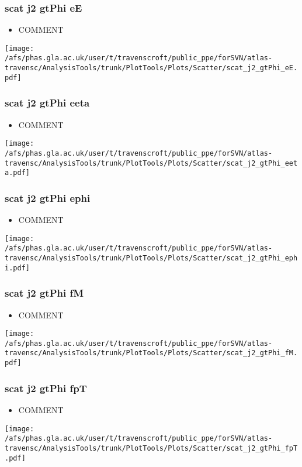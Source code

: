 \documentclass{beamer}
\begin{document}
\begin{frame}
\frametitle{scat j2 gtPhi eE}
\begin{itemize}
\item COMMENT
\end{itemize}
\begin{center}
\texttt{[image: /afs/phas.gla.ac.uk/user/t/travenscroft/public\_ppe/forSVN/atlas-travensc/AnalysisTools/trunk/PlotTools/Plots/Scatter/scat\_j2\_gtPhi\_eE.pdf]}
\end{center}
\end{frame}

\begin{frame}
\frametitle{scat j2 gtPhi eeta}
\begin{itemize}
\item COMMENT
\end{itemize}
\begin{center}
\texttt{[image: /afs/phas.gla.ac.uk/user/t/travenscroft/public\_ppe/forSVN/atlas-travensc/AnalysisTools/trunk/PlotTools/Plots/Scatter/scat\_j2\_gtPhi\_eeta.pdf]}
\end{center}
\end{frame}

\begin{frame}
\frametitle{scat j2 gtPhi ephi}
\begin{itemize}
\item COMMENT
\end{itemize}
\begin{center}
\texttt{[image: /afs/phas.gla.ac.uk/user/t/travenscroft/public\_ppe/forSVN/atlas-travensc/AnalysisTools/trunk/PlotTools/Plots/Scatter/scat\_j2\_gtPhi\_ephi.pdf]}
\end{center}
\end{frame}

\begin{frame}
\frametitle{scat j2 gtPhi fM}
\begin{itemize}
\item COMMENT
\end{itemize}
\begin{center}
\texttt{[image: /afs/phas.gla.ac.uk/user/t/travenscroft/public\_ppe/forSVN/atlas-travensc/AnalysisTools/trunk/PlotTools/Plots/Scatter/scat\_j2\_gtPhi\_fM.pdf]}
\end{center}
\end{frame}

\begin{frame}
\frametitle{scat j2 gtPhi fpT}
\begin{itemize}
\item COMMENT
\end{itemize}
\begin{center}
\texttt{[image: /afs/phas.gla.ac.uk/user/t/travenscroft/public\_ppe/forSVN/atlas-travensc/AnalysisTools/trunk/PlotTools/Plots/Scatter/scat\_j2\_gtPhi\_fpT.pdf]}
\end{center}
\end{frame}
\end{document}
